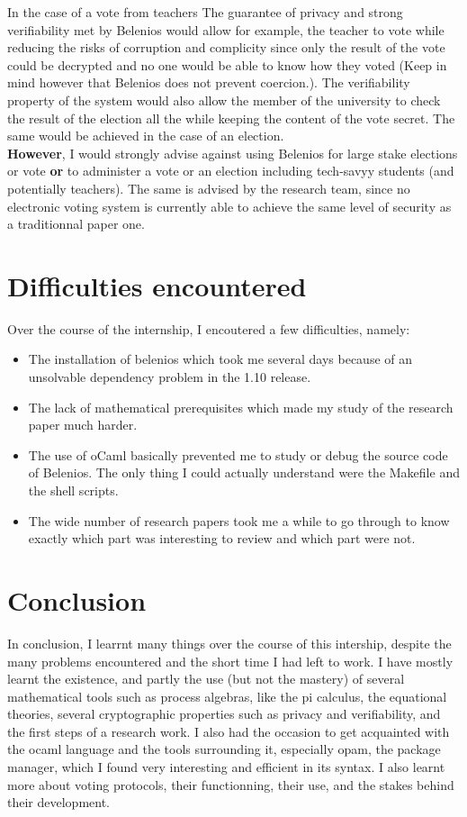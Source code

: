 \documentclass[12pt, a4paper]{report}
\begin{document}
In the case of a vote from teachers The guarantee of privacy and strong verifiability met by Belenios would allow for example, the teacher to vote while reducing the risks of corruption and complicity since only the result of the vote could be decrypted and no one would be able to know how they voted (Keep in mind however that Belenios does not prevent coercion.). The verifiability property of the system would also allow the member of the university to check the result of the election all the while keeping the content of the vote secret. The same would be achieved in the case of an election.\\

\textbf{However}, I would strongly advise against using Belenios for large stake elections or vote \textbf{or} to administer a vote or an election including tech-savyy students (and potentially teachers). The same is advised by the research team, since no electronic voting system is currently able to achieve the same level of security as a traditionnal paper one. 


\section{Difficulties encountered}

Over the course of the internship, I encoutered a few difficulties, namely:

\begin{itemize}
\item The installation of belenios which took me several days because of an unsolvable dependency problem in the 1.10 release.
\item The lack of mathematical prerequisites which made my study of the research paper much harder.
\item The use of oCaml basically prevented me to study or debug the source code of Belenios. The only thing I could actually understand were the Makefile and the shell scripts.
\item The wide number of research papers took me a while to go through to know exactly which part was interesting to review and which part were not.
\end{itemize}

\section{Conclusion}

In conclusion, I learrnt many things over the course of this intership, despite the many problems encountered and the short time I had left to work. I have mostly learnt the existence, and partly the use (but not the mastery) of several mathematical tools such as process algebras, like the pi calculus, the equational theories, several cryptographic properties such as privacy and verifiability, and the first steps of a research work. I also had the occasion to get acquainted with the ocaml language and the tools surrounding it, especially opam, the package manager, which I found very interesting and efficient in its syntax. I also learnt more about voting protocols, their functionning, their use, and the stakes behind their development. 
\end{document}
